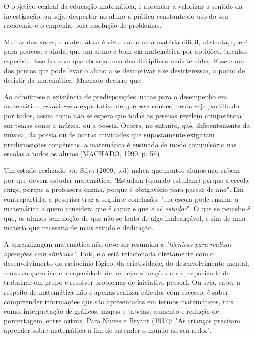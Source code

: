 \documentclass[brasil]{abnt}
\begin{document}
    O objetivo central da educação matemática, é aprender a valorizar o sentido da investigação, ou seja, despertar no aluno a prática constante do uso do seu raciocínio e o empenho pela resolução de problemas.
     
    Muitas das vezes, a matemática é vista como uma matéria difícil, abstrata, que é para poucos, e ainda, que um aluno é bom em matemática por aptidões,
    talentos especiais. Isso faz com que ela seja uma das disciplinas mais temidas. Esse é um dos pontos que pode levar o aluno a se desmotivar e se desinteressar, a ponto de desistir da matemática. 
    Machado decorre que:
    
		\begin{citacao}Ao admitir-se a existência de predisposições inatas para o desempenho em matemática, esvazia-se a expectativa de que esse conhecimento seja
					partilhado por todos, assim como não se espera que todas as pessoas revelem competência em temas como a música, ou a poesia. Ocorre, no entanto,
					que, diferentemente da música, da poesia ou de outras atividades que supostamente exigiriam predisposições congênitas, a matemática é ensinada de modo
					compulsório nas escolas a todos os alunos.(MACHADO, 1990, p. 56)
		\end{citacao}
		 
    Um estudo realizado por Silva (2009, p.3) indica que muitos alunos não sabem por que devem estudar matemática: "Estudam (quando estudam) porque a escola exige, porque a professora ensina, porque é 
    obrigatório para passar de ano". Em contrapartida, a pesquisa traz a seguinte conclusão, "...a escola pode ensinar a matemática a quem considera que é capaz e que \textit{é só estudar}". O que se percebe 
    é que, os alunos tem noção de que não se trata de algo inalcançável, e sim de uma matéria que necessita de mais estudo e dedicação.
	
	A aprendizagem matemática não deve ser resumida à \textit{"técnicas para realizar operações com símbolos"}. Pois, ela está relacionada diretamente com o desenvolvimento do raciocínio lógico, da 
	criatividade, do desenvolvimento mental, senso cooperativo e a capacidade de manejar situações reais, capacidade de trabalhar em grupo e resolver problemas de iniciativa pessoal. 
	Ou seja, saber a respeito de matemática não é apenas realizar cálculos com sucesso, é saber compreender informações que são apresentadas em termos matemáticos, tais como, interpretação de gráficos, 
	mapas e tabelas, aumento e redução de porcentagem, entre outros. Para Nunes e Bryant (1997): "As crianças precisam aprender sobre matemática a fim de entender o mundo ao seu redor".
			
\end{document}
